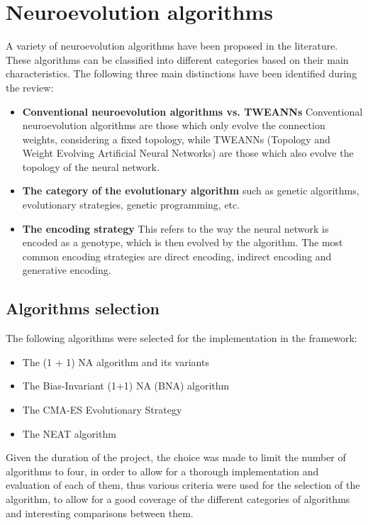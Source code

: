 \section{Neuroevolution algorithms}

A variety of neuroevolution algorithms have been proposed in the literature.
These algorithms can be classified into different categories based on their main characteristics.
The following three main distinctions have been identified during the review:

\begin{itemize}
    \item \textbf{Conventional neuroevolution algorithms vs. TWEANNs} Conventional neuroevolution algorithms are those which only evolve the connection weights,
        considering a fixed topology, while TWEANNs (Topology and Weight Evolving Artificial Neural Networks) are those which also evolve the topology of the
        neural network.
    \item \textbf{The category of the evolutionary algorithm} such as genetic algorithms, evolutionary strategies, genetic programming, etc.
    \item \textbf{The encoding strategy} This refers to the way the neural network is encoded as a genotype, which is then evolved by the algorithm.
        The most common encoding strategies are direct encoding, indirect encoding and generative encoding.
\end{itemize}


\subsection{Algorithms selection}

The following algorithms were selected for the implementation in the framework:

\begin{itemize}
    \item The (1 + 1) NA algorithm and its variants
    \item The Bias-Invariant (1+1) NA (BNA) algorithm
    \item The CMA-ES Evolutionary Strategy
    \item The NEAT algorithm
\end{itemize}

Given the duration of the project, the choice was made to limit the number of algorithms to four, in order to allow for a thorough implementation and evaluation of
each of them, thus various criteria were used for the selection of the algorithm, to allow for a good coverage of the different categories of algorithms and
interesting comparisons between them.

